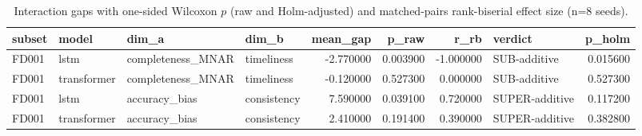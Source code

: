 \begin{table}
\caption{Interaction gaps with one-sided Wilcoxon $p$ (raw and Holm-adjusted) and matched-pairs rank-biserial effect size (n=8 seeds).}
\label{tab:D_interactions}
\begin{tabular}{llllrrrlr}
\toprule
subset & model & dim_a & dim_b & mean_gap & p_raw & r_rb & verdict & p_holm \\
\midrule
FD001 & lstm & completeness\_MNAR & timeliness & -2.770000 & 0.003900 & -1.000000 & SUB-additive & 0.015600 \\
FD001 & transformer & completeness\_MNAR & timeliness & -0.120000 & 0.527300 & 0.000000 & SUB-additive & 0.527300 \\
FD001 & lstm & accuracy\_bias & consistency & 7.590000 & 0.039100 & 0.720000 & SUPER-additive & 0.117200 \\
FD001 & transformer & accuracy\_bias & consistency & 2.410000 & 0.191400 & 0.390000 & SUPER-additive & 0.382800 \\
\bottomrule
\end{tabular}
\end{table}
